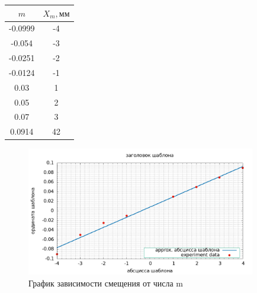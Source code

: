 \documentclass[a4paper]{article}
\begin{document}
    \begin{center}
        \begin{tabular}{|c|c|}
            \hline
            $ m $ & $ X_m, мм $ \\
            \hline
			-0.0999 & -4 \\
			-0.054 & -3 \\
			-0.0251 & -2 \\
			-0.0124 & -1 \\
			0.03 & 1 \\
			0.05 & 2 \\
			0.07 & 3 \\
			0.0914 & 42 \\
            \hline
        \end{tabular}
    \end{center}

    \begin{figure}[ht!]
    \centering
    \includegraphics[width=100mm]{result.png}
    
    \caption{График зависимости смещения от числа m \label{overflow}}
    \end{figure}
\end{document}
